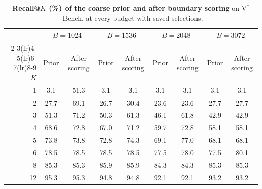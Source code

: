 \begin{table}[t]
  \centering
  \footnotesize
  \setlength{\tabcolsep}{4pt}
  \begin{tabular}{r cc cc cc cc}
    \toprule
    & \multicolumn{2}{c}{$B=1024$} & \multicolumn{2}{c}{$B=1536$} & \multicolumn{2}{c}{$B=2048$} & \multicolumn{2}{c}{$B=3072$} \\
    \cmidrule(lr){2-3}\cmidrule(lr){4-5}\cmidrule(lr){6-7}\cmidrule(lr){8-9}
    $K$ & Prior & After scoring & Prior & After scoring & Prior & After scoring & Prior & After scoring \\
    \midrule
    1 & 3.1 & 51.3 & 3.1 & 3.1 & 3.1 & 3.1 & 3.1 & 3.1 \\
    2 & 27.7 & 69.1 & 26.7 & 30.4 & 23.6 & 23.6 & 27.7 & 27.7 \\
    3 & 51.3 & 71.2 & 50.3 & 61.3 & 46.1 & 61.8 & 42.9 & 42.9 \\
    4 & 68.6 & 72.8 & 67.0 & 71.2 & 59.7 & 72.8 & 58.1 & 58.1 \\
    5 & 73.8 & 73.8 & 72.8 & 74.3 & 69.1 & 77.0 & 68.1 & 68.1 \\
    6 & 78.5 & 78.5 & 78.5 & 78.5 & 77.5 & 78.0 & 77.5 & 80.1 \\
    8 & 85.3 & 85.3 & 85.9 & 85.9 & 84.3 & 84.3 & 85.3 & 85.3 \\
    12 & 95.3 & 95.3 & 94.8 & 94.8 & 92.1 & 92.1 & 93.2 & 93.2 \\
    \bottomrule
  \end{tabular}
  \caption{\textbf{Recall@$K$ (\%) of the coarse prior and after boundary scoring} on V$^*$~Bench, at every budget with saved selections.}
  \label{tab:recall_full}
\end{table}
